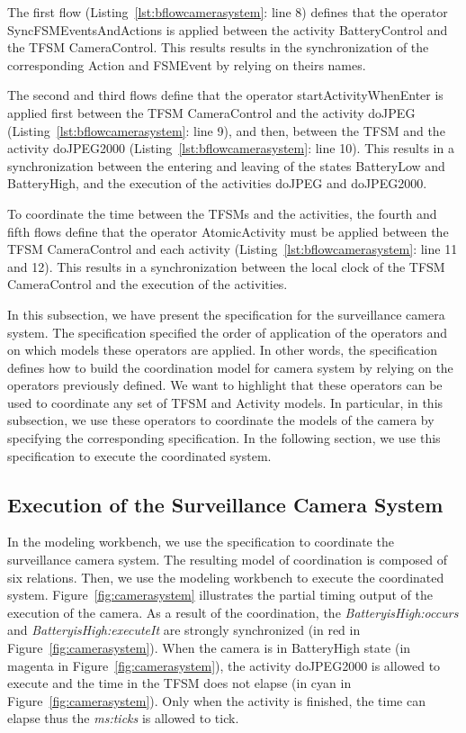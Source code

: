 The first flow (Listing~\ref{lst:bflowcamerasystem}: line 8) defines that the operator SyncFSMEventsAndActions is applied between the activity BatteryControl and the TFSM CameraControl. This results results in the synchronization of the corresponding Action and FSMEvent by relying on theirs names. 

The second and third flows define that the operator startActivityWhenEnter is applied first between the TFSM CameraControl and the activity doJPEG (Listing~\ref{lst:bflowcamerasystem}: line 9), and then, between the TFSM and the activity doJPEG2000 (Listing~\ref{lst:bflowcamerasystem}: line 10). This results in a synchronization between the entering and leaving of the states BatteryLow and BatteryHigh, and the execution of the activities doJPEG and doJPEG2000. 

To coordinate the time between the TFSMs and the activities, the fourth and fifth flows define that the operator AtomicActivity must be applied between the TFSM CameraControl and each activity (Listing~\ref{lst:bflowcamerasystem}: line 11 and 12). This results in a synchronization between the local clock of the TFSM CameraControl and the execution of the activities. 

In this subsection, we have present the \bflow specification for the surveillance camera system. The specification specified the order of application of the operators and on which models these operators are applied. In other words, the \bflow specification defines how to build the coordination model for camera system by relying on the operators previously defined. We want to highlight that these \bcool operators can be used to coordinate any set of TFSM and Activity models. In particular, in this subsection, we use these operators to coordinate the models of the camera by specifying the corresponding \bflow specification. In the following section, we use this specification to execute the coordinated system.    

\subsection{Execution of the Surveillance Camera System}

In the modeling workbench, we use the \bflow specification to coordinate the surveillance camera system. The resulting model of coordination is composed of six \ccsl relations. Then, we use the modeling workbench to execute the coordinated system. Figure~\ref{fig:camerasystem} illustrates the partial timing output of the execution of the camera. As a result of the coordination, the \mse \emph{BatteryisHigh:occurs} and \emph{BatteryisHigh:executeIt} are strongly synchronized (in red in Figure~\ref{fig:camerasystem}). When the camera is in BatteryHigh state (in magenta in Figure~\ref{fig:camerasystem}), the activity doJPEG2000 is allowed to execute and the time in the TFSM does not elapse (in cyan in Figure~\ref{fig:camerasystem}). Only when the activity is finished, the time can elapse thus the \mse \emph{ms:ticks} is allowed to tick. 

